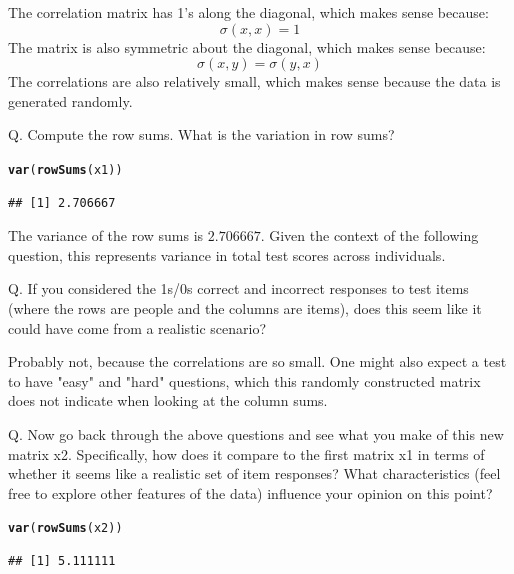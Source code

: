 \documentclass[letterpaper,12pt]{article}\usepackage[]{graphicx}\usepackage[]{color}
\makeatletter
\newcommand{\hlstd}[1]{\textcolor[rgb]{0.345,0.345,0.345}{#1}}%
\newcommand{\hlkwd}[1]{\textcolor[rgb]{0.737,0.353,0.396}{\textbf{#1}}}%
\newenvironment{kframe}{%
 \def\at@end@of@kframe{}%
 \ifinner\ifhmode%
  \def\at@end@of@kframe{\end{minipage}}%
  \begin{minipage}{\columnwidth}%
 \fi\fi%
 \def\FrameCommand##1{\hskip\@totalleftmargin \hskip-\fboxsep
 \colorbox{shadecolor}{##1}\hskip-\fboxsep
     \hskip-\linewidth \hskip-\@totalleftmargin \hskip\columnwidth}%
 \MakeFramed {\advance\hsize-\width
   \@totalleftmargin\z@ \linewidth\hsize
   \@setminipage}}%
 {\par\unskip\endMakeFramed%
 \at@end@of@kframe}
\newenvironment{knitrout}{}{} %
\numberwithin{equation}{section}
\makeatother
\begin{document}
The correlation matrix has 1's along the diagonal, which makes sense because: 
			\[ \sigma(x,x)=1 \]
The matrix is also symmetric about the diagonal, which makes sense because:
			\[ \sigma(x,y) = \sigma(y,x) \]  
The correlations are also relatively small, which makes sense because the data is generated randomly.


Q. Compute the row sums. What is the variation in row sums?

\begin{knitrout}
\color{fgcolor}\begin{kframe}
\begin{alltt}
\hlkwd{var}\hlstd{(}\hlkwd{rowSums}\hlstd{(x1))}
\end{alltt}
\begin{verbatim}
## [1] 2.706667
\end{verbatim}
\end{kframe}
\end{knitrout}

The variance of the row sums is $2.706667$.  Given the context of the following question, this represents variance in total test scores across individuals.


Q. If you considered the 1s/0s correct and incorrect responses to test items (where the rows are people and the columns are items), does this seem like it could have come from a realistic scenario?



Probably not, because the correlations are so small.  One might also expect a test to have "easy" and "hard" questions, which this randomly constructed matrix does not indicate when looking at the column sums.


Q. Now go back through the above questions and see what you make of this new matrix x2. Specifically, how does it compare to the first matrix x1 in terms of whether it seems like a realistic set of item responses? What characteristics (feel free to explore other features of the data) influence your opinion on this point?

\begin{knitrout}
\color{fgcolor}\begin{kframe}
\begin{alltt}
\hlkwd{var}\hlstd{(}\hlkwd{rowSums}\hlstd{(x2))}
\end{alltt}
\begin{verbatim}
## [1] 5.111111
\end{verbatim}
\end{kframe}
\end{knitrout}
\end{document}
